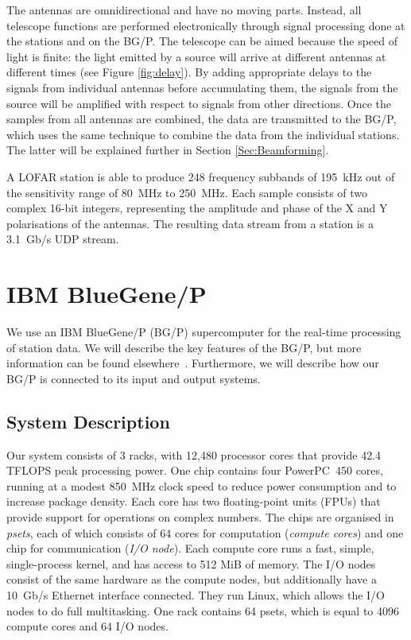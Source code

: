 \documentclass{llncs}
\begin{document}
The antennas are omnidirectional and have no moving parts. Instead, all telescope functions are performed electronically through signal processing done at the stations and on the BG/P. The telescope can be aimed because the speed of light is finite: the light emitted by a source will arrive at different antennas at different times (see Figure \ref{fig:delay}). By adding appropriate delays to the signals from individual antennas before accumulating them, the signals from the source will be amplified with respect to signals from other directions. Once the samples from all antennas are combined, the data are transmitted to the BG/P, which uses the same technique to combine the data from the individual stations. The latter will be explained further in Section \ref{Sec:Beamforming}.

A LOFAR station is able to produce 248 frequency subbands of 195~kHz out of the sensitivity range of 80~MHz to 250~MHz. Each sample consists of two complex 16-bit integers, representing the amplitude and phase of the X and Y polarisations of the antennas. The resulting data stream from a station is a 3.1~Gb/s UDP stream.


\section{IBM BlueGene/P}

We use an IBM BlueGene/P (BG/P) supercomputer for the real-time processing of station data. We will describe the key features of the BG/P, but more information can be found elsewhere~\cite{IBM:08}. Furthermore, we will describe how our BG/P is connected to its input and output systems.

\subsection{System Description}

Our system consists of 3 racks, with 12,480 processor cores that provide 42.4 TFLOPS peak processing power. One chip contains four PowerPC~450 cores, running at a modest 850~MHz clock speed to reduce power consumption and to increase package density. Each core has two floating-point units (FPUs) that provide support for operations on complex numbers. The chips are organised in \emph{psets}, each of which consists of 64 cores for computation (\emph{compute cores}) and one chip for communication (\emph{I/O node}). Each compute core runs a fast, simple, single-process kernel,  and has access to 512 MiB of memory. The I/O nodes consist of the same hardware as the compute nodes, but additionally have a 10~Gb/s Ethernet interface connected. They run Linux, which allows the I/O nodes to do full multitasking. One rack contains 64 psets, which is equal to 4096 compute cores and 64 I/O nodes.
\end{document}
